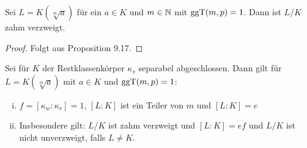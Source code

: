 \begin{Bsp}
	Sei $L=K(\sqrt[m]{a})$ für ein $a\in K$ und $m\in\mathbb{N}$ mit $\operatorname{ggT}(m,p) = 1$.
	Dann ist $L/K$ zahm verzweigt.
\end{Bsp}

\begin{proof}
	Folgt aus Proposition 9.17.
\end{proof}

\begin{Prop}
	Sei für $K$ der Restklassenkörper $\kappa_v$ separabel abgeschlossen. Dann gilt für $L=K(\sqrt[m]{a})$ mit $a\in K$ und $\operatorname{ggT}(m,p) = 1$:
	\begin{enumerate}[(i)]
		\item $f=[\kappa_w : \kappa_v] = 1$, $[L:K]$ ist ein Teiler von $m$ und $[L:K] = e$
		\item Insbesondere gilt: $L/K$ ist zahm verzweigt und $[L:K] = ef$ und $L/K$ ist nicht unverzweigt, falls $L\neq K$.
	\end{enumerate}
\end{Prop}


